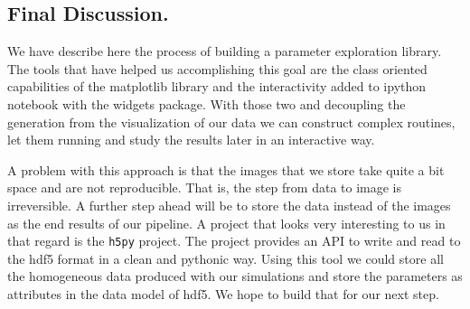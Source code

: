 \documentclass[11pt,a4paper]{article}
\begin{document}
\subsection{Final Discussion.}\label{final-discussion.}

We have describe here the process of building a parameter exploration
library. The tools that have helped us accomplishing this goal are the
class oriented capabilities of the matplotlib library and the
interactivity added to ipython notebook with the widgets package. With
those two and decoupling the generation from the visualization of our
data we can construct complex routines, let them running and study the
results later in an interactive way.

A problem with this approach is that the images that we store take quite
a bit space and are not reproducible. That is, the step from data to
image is irreversible. A further step ahead will be to store the data
instead of the images as the end results of our pipeline. A project that
looks very interesting to us in that regard is the \texttt{h5py}
project. The project provides an API to write and read to the hdf5
format in a clean and pythonic way. Using this tool we could store all
the homogeneous data produced with our simulations and store the
parameters as attributes in the data model of hdf5. We hope to build
that for our next step.




\end{document}
